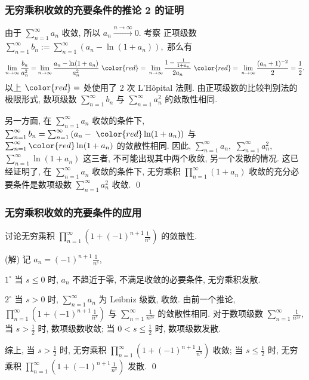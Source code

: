 \begin{frame}
\frametitle{无穷乘积收敛的充要条件的推论 2 的证明}

由于 $\sum_{n=1}^\infty a_n$ 收敛, 所以 $a_n \xrightarrow[]{n \to \infty} 0$. 考察 \alert{正项级数} $\sum_{n=1}^\infty b_n := \sum_{n=1}^\infty \left( a_n - \ln(1 + a_n) \right),$ 那么有
\[
\lim_{n \to \infty} \frac{b_n}{a_n^2} = \lim_{n \to \infty} \frac{a_n - \ln(1 + a_n)}{a_n^2} ~ {\color{red}=} ~ \lim_{n \to \infty} \frac{1 - \frac{1}{1 + a_n}}{2a_n} ~ {\color{red}=} ~ \lim_{n \to \infty} \frac{(a_n + 1)^{-2}}{2} = \frac{1}{2}.
\]
以上 ${\color{red}=}$ 处使用了 2 次 L'Hôpital 法则. 由正项级数的比较判别法的极限形式, 数项级数 $\sum_{n=1}^\infty b_n$ 与 $\sum_{n=1}^\infty a_n^2$ 的敛散性相同.

\pause

另一方面, 在 $\sum_{n=1}^\infty a_n$ 收敛的条件下, $\sum_{n=1}^\infty b_n = \sum_{n=1}^\infty \left( a_n - ~{\color{red}\ln(1 + a_n)} \right)$ 与 $\sum_{n=1}^\infty {\color{red}\ln(1 + a_n)}$ 的敛散性相同.
\pause
因此, $\sum_{n=1}^\infty a_n,$ $\sum_{n=1}^\infty a_n^2,$ $\sum_{n=1}^\infty \ln(1 + a_n)$ 这三者, 不可能出现其中两个收敛, 另一个发散的情况. 这已经证明了, 在 $\sum_{n=1}^\infty a_n$ 收敛的条件下, 无穷乘积 $\prod_{n=1}^\infty (1 + a_n)$ 收敛的充分必要条件是数项级数 $\sum_{n=1}^\infty a_n^2$ 收敛.
\qed

\end{frame}


\begin{frame}
\frametitle{无穷乘积收敛的充要条件的应用}

\begin{eg}
讨论无穷乘积 $\prod_{n=1}^\infty \left( 1 + (-1)^{n+1} \frac{1}{n^s} \right)$ 的敛散性.
\end{eg}

\pause

\startproof[bg=yellow, fg=red](解)
记 $a_n = (-1)^{n+1} \frac{1}{n^s}$,

\vspace{0.5em}

$1^{\circ}$ 当 $s \leqslant 0$ 时, $a_n$ 不趋近于零, 不满足收敛的必要条件, 无穷乘积发散.

\pause

$2^{\circ}$ 当 $s > 0$ 时, $\sum_{n=1}^\infty a_n$ 为 Leibniz 级数, 收敛. 由前一个推论, $\prod_{n=1}^\infty \left( 1 + (-1)^{n+1} \frac{1}{n^s} \right)$ 与 $\sum_{n=1}^\infty \frac{1}{n^{2s}}$ 的敛散性相同.
\pause
对于数项级数 $\sum_{n=1}^\infty \frac{1}{n^{2s}}$, 当 $s > \frac{1}{2}$ 时, 数项级数收敛; 当 $0 < s \leqslant \frac{1}{2}$ 时, 数项级数发散.

\pause
\vspace{0.5em}

综上, 当 $s > \frac{1}{2}$ 时, 无穷乘积 $\prod_{n=1}^\infty \left( 1 + (-1)^{n+1} \frac{1}{n^s} \right)$ 收敛; 当 $s \leqslant \frac{1}{2}$ 时, 无穷乘积 $\prod_{n=1}^\infty \left( 1 + (-1)^{n+1} \frac{1}{n^s} \right)$ 发散.
\qed

\end{frame}

